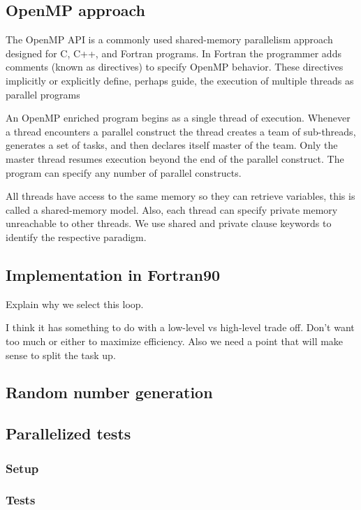\subsection*{OpenMP approach} %
The OpenMP API is a commonly used shared-memory parallelism approach designed for C, C++, and Fortran programs.
In Fortran the programmer adds comments (known as directives) to specify OpenMP behavior.
These directives implicitly or explicitly define, perhaps guide, the execution of multiple threads as parallel programs

An OpenMP enriched program begins as a single thread of execution.
Whenever a thread encounters a parallel construct the thread creates a team of sub-threads, generates a set of tasks, and then declares itself master of the team.
Only the master thread resumes execution beyond the end of the parallel construct.
The program can specify any number of parallel constructs.

All threads have access to the same memory so they can retrieve variables, this is called a shared-memory model.
Also, each thread can specify private memory unreachable to other threads.
We use shared and private clause keywords to identify the respective paradigm.

\subsection*{Implementation in Fortran90}
Explain why we select this loop. %

I think it has something to do with a low-level vs high-level trade off. Don't want too much or either to maximize efficiency. Also we need a point that will make sense to split the task up.


\subsection*{Random number generation}


\subsection*{Parallelized tests}

\subsubsection*{Setup}
\subsubsection*{Tests}
